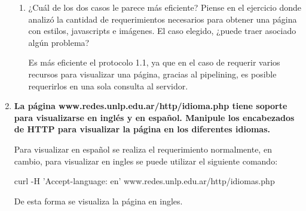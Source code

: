 \documentclass[a4paper,10pt]{article}
\begin{document}
\begin{enumerate}
\begin{enumerate}
            \item ¿Cuál de los dos casos le parece más eficiente? Piense en el ejercicio donde analizó la cantidad de requerimientos necesarios para obtener una página con estilos, javascripts e imágenes. El caso elegido, ¿puede traer asociado algún problema?

            Es más eficiente el protocolo 1.1, ya que en el caso de requerir varios recursos para visualizar una página, gracias al pipelining, es posible requerirlos en una sola consulta al servidor.
        \end{enumerate}

    \item \textbf{La página www.redes.unlp.edu.ar/http/idioma.php tiene soporte para visualizarse en inglés y en español. Manipule los encabezados de HTTP para visualizar la página en los diferentes idiomas.}

    Para visualizar en español se realiza el requerimiento normalmente, en cambio, para visualizar en ingles se puede utilizar el siguiente comando:

    \subitem curl -H 'Accept-language: en' www.redes.unlp.edu.ar/http/idiomas.php

    De esta forma se visualiza la página en ingles.

\end{enumerate}
\end{document}
